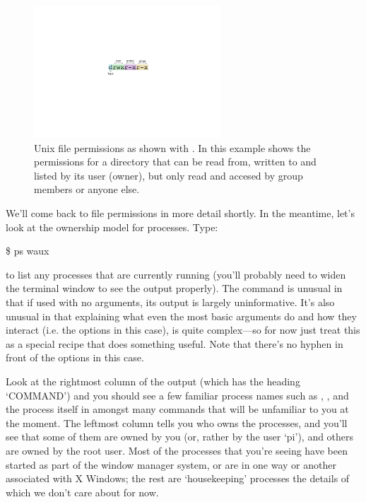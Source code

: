 \begin{figure}
\centerline{\includegraphics[width=7cm]{images/filepermissions}}
\caption{Unix file permissions as shown with . In this example shows the permissions for a directory that can be read from, written to and listed by its user (owner), but only read and accesed by group members or anyone else.}\label{figure:fileperms}
\end{figure}

We'll come back to file permissions in more detail shortly. In the meantime, let's look at the ownership model for processes. Type:

\begin{ttoutenv}
\$ ps waux
\end{ttoutenv}

to list any processes that are currently running (you'll probably need to widen the terminal window to see the output properly). The  command is unusual in that if used with no arguments, its output is largely uninformative. It's also unusual in that explaining what even the most basic arguments do and how they interact (i.e. the  options in this case), is quite complex---so for now just treat this as a special recipe that does something useful. Note that there's no hyphen in front of the options in this case.

Look at the rightmost column of the output (which has the heading `COMMAND') and you should see a few familiar process names such as , , and the  process itself in amongst many commands that will be unfamiliar to you at the moment. The leftmost column tells you who owns the processes, and you'll see that some of them are owned by you (or, rather by the user `pi'), and others are owned by the root user. Most of the processes that you're seeing have been started as part of the window manager system, or are in one way or another associated with X Windows; the rest are `housekeeping' processes the details of which we don't care about for now. 

